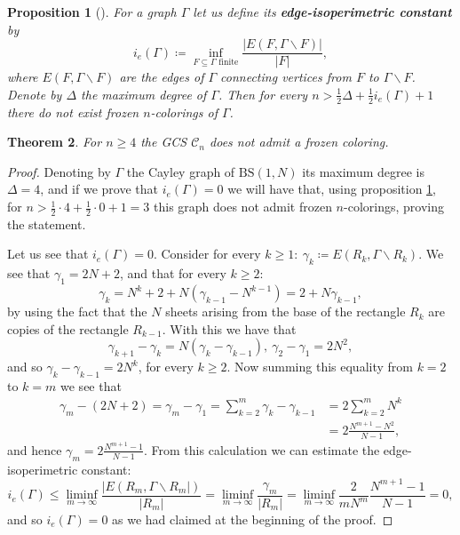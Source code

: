 \documentclass[letterpaper,10pt]{amsart}
\theoremstyle{plain}
\newtheorem{theorem}{Theorem}[section]
\newtheorem{proposition}[theorem]{Proposition}
\newcommand{\BS}[1][N]{\mathrm{BS}(1,#1)}
\begin{document}
\begin{proposition}[{\cite[Proposition~2.2]{alon2019mixing}}]\label{prop:nofroz_graph} For a graph $\Gamma$ let us define its \textbf{edge-isoperimetric constant} by
	$$
	i_e(\Gamma)\coloneqq \inf_{F\subseteq \Gamma \text{ finite}}\frac{|E(F,\Gamma\backslash F)|}{|F|},
	$$
	where $E(F,\Gamma\backslash F)$ are the edges of $\Gamma$ connecting vertices from $F$ to $\Gamma\backslash F$. Denote by $\Delta$ the maximum degree of $\Gamma$. Then for every $n>\frac{1}{2}\Delta+\frac{1}{2}i_e(\Gamma)+1$ there do not exist frozen $n$-colorings of $\Gamma$.
\end{proposition}
\begin{theorem}\label{thm:no_frozen_n_ge_4} For $n\ge 4$ the GCS $\mathcal{C}_n$ does not admit a frozen coloring.
\end{theorem}
\begin{proof}
	Denoting by $\Gamma$ the Cayley graph of $\BS$ its maximum degree is $\Delta=4$, and if we prove that $i_e(\Gamma)=0$ we will have that, using proposition \ref{prop:nofroz_graph}, for $n>\frac{1}{2}\cdot 4+\frac{1}{2}\cdot 0+1=3$ this graph does not admit frozen $n$-colorings, proving the statement.
	
	Let us see that $i_e(\Gamma)=0$. Consider for every $k\ge 1: \ \gamma_{k}\coloneqq E(R_k,\Gamma\backslash R_k)$. We see that $\gamma_1=2N+2$, and that for every $k\ge 2$:
	$$
	\gamma_k=N^k+2+N(\gamma_{k-1}-N^{k-1})=2+N\gamma_{k-1},
	$$
	by using the fact that the $N$ sheets arising from the base of the rectangle $R_k$ are copies of the rectangle $R_{k-1}$. 
	With this we have that 
	$$
	\gamma_{k+1}-\gamma_{k}=N(\gamma_k-\gamma_{k-1}), \ \gamma_{2}-\gamma_{1}=2N^2,
	$$
	and so $\gamma_{k}-\gamma_{k-1}=2N^k$, for every $k\ge 2$. Now summing this equality from $k=2$ to $k=m$ we see that
	\begin{align*}
	\gamma_{m}-(2N+2)=\gamma_{m}-\gamma_{1}=\sum_{k=2}^m \gamma_{k}-\gamma_{k-1}&=2\sum_{k=2}^m N^k \\
	&= 2\frac{N^{m+1}-N^2}{N-1},
	\end{align*}
	and hence $\gamma_{m}=2\frac{N^{m+1}-1}{N-1}$. From this calculation we can estimate the edge-isoperimetric constant:
	$$
	i_e(\Gamma)\le \liminf_{m\to \infty}\frac{|E(R_m,\Gamma\backslash R_m|)}{|R_m|}=\liminf_{m\to \infty}\frac{\gamma_m}{|R_m|}=\liminf_{m\to \infty}\frac{2}{mN^m}\frac{N^{m+1}-1}{N-1}=0,
	$$
	and so $i_e(\Gamma)=0$ as we had claimed at the beginning of the proof.
\end{proof}
	
\end{document}
